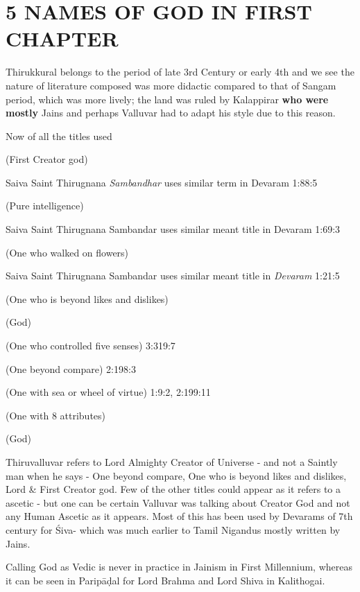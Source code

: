 \section*{5 NAMES OF GOD IN FIRST CHAPTER}

Thirukkural belongs to the period of late 3rd Century or early 4th and we see the nature of literature composed was more didactic compared to that of Sangam period, which was more lively; the land was ruled by Kalappirar \textbf{who were mostly} Jains and perhaps Valluvar had to adapt his style due to this reason.

Now of all the titles used

 (First Creator god)

Saiva Saint Thirugnana \textit{Sambandhar} uses similar term in Devaram 1:88:5

 (Pure intelligence)

Saiva Saint Thirugnana Sambandar uses similar meant title in Devaram 1:69:3

 (One who walked on flowers)

Saiva Saint Thirugnana Sambandar uses similar meant title in \textit{Devaram} 1:21:5

 (One who is beyond likes and dislikes)

 (God)

 (One who controlled five senses) 3:319:7

 (One beyond compare) 2:198:3

 (One with sea or wheel of virtue) 1:9:2, 2:199:11

 (One with 8 attributes)

 (God)

Thiruvalluvar refers to Lord Almighty Creator of Universe - and not a Saintly man when he says - One beyond compare, One who is beyond likes and dislikes, Lord \& First Creator god. Few of the other titles could appear as it refers to a ascetic - but one can be certain Valluvar was talking about Creator God and not any Human Ascetic as it appears. Most of this has been used by Devarams of 7th century for Śiva- which was much earlier to Tamil Nigandus mostly written by Jains.

Calling God as Vedic is never in practice in Jainism in First Millennium, whereas it can be seen in Paripāḍal for Lord Brahma and Lord Shiva in Kalithogai.

